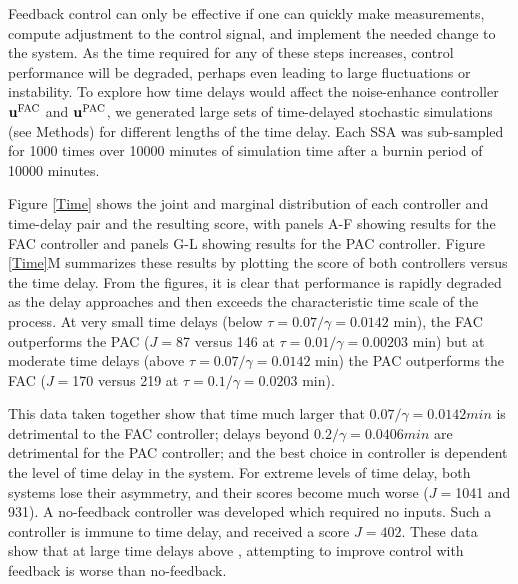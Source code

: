 \documentclass[12pt]{article}
\begin{document}
Feedback control can only be effective if one can quickly make measurements, compute adjustment to the control signal, and implement the needed change to the system. As the time required for any of these steps increases, control performance will be degraded, perhaps even leading to large fluctuations or instability. To explore how time delays would affect the noise-enhance controller $\mathbf{u}^{\rm FAC}$ and $\mathbf{u}^{\rm PAC}$, we generated large sets of time-delayed stochastic simulations (see Methods) for different lengths of the time delay. Each SSA was sub-sampled for 1000 times over 10000 minutes of simulation time after a burnin period of 10000 minutes.

Figure \ref{Time} shows the joint and marginal distribution of each controller and time-delay pair and the resulting score, with panels A-F showing results for the FAC controller and panels G-L showing results for the PAC controller. Figure \ref{Time}M summarizes these results by plotting the score of both controllers versus the time delay. From the figures, it is clear that performance is rapidly degraded as the delay approaches and then exceeds the characteristic time scale of the process. At very small time delays (below $\tau = 0.07/\gamma = 0.0142$ min), the FAC outperforms the PAC ($J=$87 versus 146 at $\tau = 0.01/\gamma = 0.00203$ min) but at moderate time delays (above $\tau = 0.07/\gamma = 0.0142$ min) the PAC outperforms the FAC ($J=$170 versus 219 at $\tau = 0.1/\gamma = 0.0203$ min). 

This data taken together show that time much larger that $0.07 / \gamma = 0.0142 min$ is detrimental to the FAC controller; delays beyond $0.2 / \gamma = 0.0406 min$ are detrimental for the PAC controller; and the best choice in controller is dependent the level of time delay in the system.  For extreme levels of time delay, both systems lose their asymmetry, and their scores become much worse ($J=$1041 and 931). A no-feedback controller was developed which required no inputs. Such a controller is immune to time delay, and received a score $J=402$. These data show that at large time delays above , attempting to improve control with feedback is worse than no-feedback.

\end{document}

